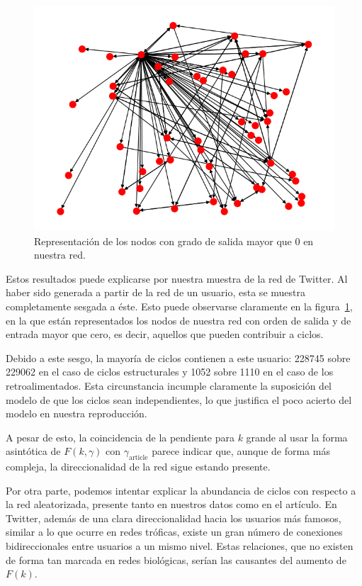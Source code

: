 \documentclass[1p]{elsarticle}
\begin{document}
\begin{figure}
    \centering
    \includegraphics[width=0.5\paperwidth]{graph_sevaseviene.png}
    \caption{Representación de los nodos con grado de salida mayor que 0 en nuestra red.}
    \label{fig:sevaseviene_network}
\end{figure}

    Estos resultados puede explicarse por nuestra muestra de la red de Twitter.
    Al haber sido generada a partir de la red de un usuario, esta se muestra completamente sesgada a éste.
    Esto puede observarse claramente en la figura~\ref{fig:sevaseviene_network}, en la que están representados los nodos de nuestra red con orden de salida y de entrada mayor que cero, es decir, aquellos que pueden contribuir a ciclos.
    
    Debido a este sesgo, la mayoría de ciclos contienen a este usuario: 228745 sobre 229062 en el caso de ciclos estructurales y 1052 sobre 1110 en el caso de los retroalimentados.
    Esta circunstancia incumple claramente la suposición del modelo de que los ciclos sean independientes, lo que justifica el poco acierto del modelo en nuestra reproducción.

    A pesar de esto, la coincidencia de la pendiente para $k$ grande al usar la forma asintótica de $F(k, \gamma)$ con $\gamma_{\textrm{article}}$ parece indicar que, aunque de forma más compleja, la direccionalidad de la red sigue estando presente.

    Por otra parte, podemos intentar explicar la abundancia de ciclos con respecto a la red aleatorizada, presente tanto en nuestros datos como en el artículo.
    En Twitter, además de una clara direccionalidad hacia los usuarios más famosos, similar a lo que ocurre en redes tróficas, existe un gran número de conexiones bidireccionales entre usuarios a un mismo nivel. Estas relaciones, que no existen de forma tan marcada en redes biológicas, serían las causantes del aumento de $F(k)$.
\end{document}
